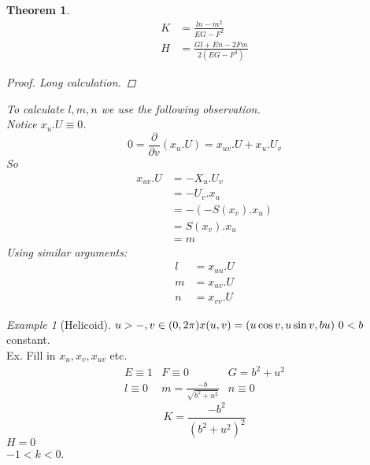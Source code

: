 \documentclass{article}
\newcommand{\pdv}[2]{\frac{\partial #1}{\partial #2}}
\newtheorem{theorem}{Theorem}[section]
\theoremstyle{definition}
\theoremstyle{remark}
\theoremstyle{example}
\newtheorem*{example}{Example}
\begin{document}
	\begin{theorem}
		\begin{align*}
			K&=\frac{ln-m^2}{EG-F^2}\\
			H&=\frac{Gl+En-2Fm}{2(EG-F^2)}
		\end{align*}
		\begin{proof}Long calculation.\end{proof}
		To calculate $l,m,n$ we use the following observation.\\
		Notice $x_u.U\equiv 0$.\\
		\[0=\pdv{}{v}(x_u.U)=x_{uv}.U+x_u.U_v\]
		So \begin{align*}
			x_{uv}.U&=-X_u.U_v\\
			&=-U_v.x_u\\
			&=-(-S(x_v).x_u)\\
			&=S(x_v).x_u\\
			&=m
		\end{align*}
		Using similar arguments:
		\begin{align*}
			l &= x_{uu}.U\\
			m&=x_{uv}.U\\
			n&=x_{vv}.U
		\end{align*}
	\end{theorem}
	\begin{example}[Helicoid]
		$u>-, v \in (0,2 \pi )\\
		x(u,v)=(u \cos v,u \sin v, bu)\ 0<b$ constant.\\
		Ex. Fill in $x_u, x_v, x_{uv}$ etc. 
		\[\begin{matrix}
			E\equiv 1 & F \equiv 0 & G = b^2+u^2\\
			l \equiv 0 & m=\frac{-b}{\sqrt{b^2+u^2}} & n \equiv 0
		\end{matrix}\]
		\[K=\frac{-b^2}{(b^2+u^2)^2}\]
		$H=0$\\
		$-1 < k < 0$.
	\end{example}
\end{document}
